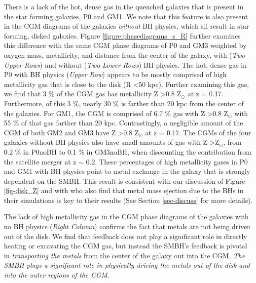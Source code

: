 \documentclass[]{emulateapj}
\begin{document}
There is a lack of the hot, dense gas in the quenched galaxies that is present in the star forming galaxies, P0 and GM1. We note that this feature is also present in the CGM diagrams of the galaxies \textit{without} BH physics, which all result in star forming, disked galaxies. Figure \ref{figure:phasediagrams_z_R} further examines this difference with the same CGM phase diagrams of P0 and GM3 weighted by oxygen mass, metallicity, and distance from the center of the galaxy, with (\textit{Two Upper Rows}) and without (\textit{Two Lower Rows}) BH physics. The hot, dense gas in P0 with BH physics (\textit{Upper Row}) appears to be mostly comprised of high metallicity gas that is close to the disk (R \textless 50 kpc). Further examining this gas, we find that 3 $\%$ of the CGM gas has metallicity Z \textgreater 0.8 Z$_{\odot}$ at z = 0.17. Furthermore, of this 3 $\%$, nearly 30 $\%$ is farther than 20 kpc from the center of the galaxies. For GM1, the CGM is comprised of 6.7 $\%$ gas with Z \textgreater 0.8 Z$_{\odot}$ with 55 $\%$ of that gas farther than 20 kpc. Contrastingly, a negligible amount of the CGM of both GM2 and GM3 have Z \textgreater 0.8 Z$_{\odot}$ at z = 0.17. The CGMs of the four galaxies without BH physics also have small amounts of gas with Z \textgreater Z$_{\odot}$, from 0.2 $\%$ in P0noBH to 0.1 $\%$ in GM3noBH, when discounting the contribution from the satellite merger at z $\sim$ 0.2. These percentages of high metallicity gases in P0 and GM1 with BH physics point to metal exchange in the galaxy that is strongly dependent on the SMBH. This result is consistent with our discussion of Figure \ref{fig-disk_Z} and with \cite{Nelson2018} who also find that metal mass ejection due to the BHs in their simulations is key to their results (See Section \ref{sec-discuss} for more details).

The lack of high metallicity gas in the CGM phase diagrams of the galaxies with no BH physics (\textit{Right Column}) confirms the fact that metals are not being driven out of the disk. We find that feedback does not play a significant role in directly heating or excavating the CGM gas, but instead the SMBH's feedback is pivotal in \textit{transporting the metals} from the center of the galaxy out into the CGM. \textit{The SMBH plays a significant role in physically driving the metals out of the disk and into the outer regions of the CGM.}

\end{document}

